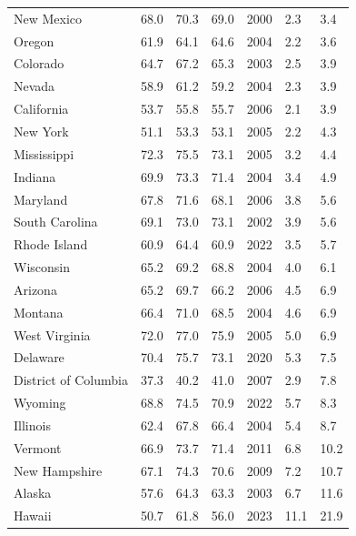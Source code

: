 \begin{longtable}{llllrll}
New Mexico & 68.0 & 70.3 & 69.0 & 2000 & 2.3 & 3.4 \\
Oregon & 61.9 & 64.1 & 64.6 & 2004 & 2.2 & 3.6 \\
Colorado & 64.7 & 67.2 & 65.3 & 2003 & 2.5 & 3.9 \\
Nevada & 58.9 & 61.2 & 59.2 & 2004 & 2.3 & 3.9 \\
California & 53.7 & 55.8 & 55.7 & 2006 & 2.1 & 3.9 \\
New York & 51.1 & 53.3 & 53.1 & 2005 & 2.2 & 4.3 \\
Mississippi & 72.3 & 75.5 & 73.1 & 2005 & 3.2 & 4.4 \\
Indiana & 69.9 & 73.3 & 71.4 & 2004 & 3.4 & 4.9 \\
Maryland & 67.8 & 71.6 & 68.1 & 2006 & 3.8 & 5.6 \\
South Carolina & 69.1 & 73.0 & 73.1 & 2002 & 3.9 & 5.6 \\
Rhode Island & 60.9 & 64.4 & 60.9 & 2022 & 3.5 & 5.7 \\
Wisconsin & 65.2 & 69.2 & 68.8 & 2004 & 4.0 & 6.1 \\
Arizona & 65.2 & 69.7 & 66.2 & 2006 & 4.5 & 6.9 \\
Montana & 66.4 & 71.0 & 68.5 & 2004 & 4.6 & 6.9 \\
West Virginia & 72.0 & 77.0 & 75.9 & 2005 & 5.0 & 6.9 \\
Delaware & 70.4 & 75.7 & 73.1 & 2020 & 5.3 & 7.5 \\
District of Columbia & 37.3 & 40.2 & 41.0 & 2007 & 2.9 & 7.8 \\
Wyoming & 68.8 & 74.5 & 70.9 & 2022 & 5.7 & 8.3 \\
Illinois & 62.4 & 67.8 & 66.4 & 2004 & 5.4 & 8.7 \\
Vermont & 66.9 & 73.7 & 71.4 & 2011 & 6.8 & 10.2 \\
New Hampshire & 67.1 & 74.3 & 70.6 & 2009 & 7.2 & 10.7 \\
Alaska & 57.6 & 64.3 & 63.3 & 2003 & 6.7 & 11.6 \\
Hawaii & 50.7 & 61.8 & 56.0 & 2023 & 11.1 & 21.9 \\

\end{longtable}
